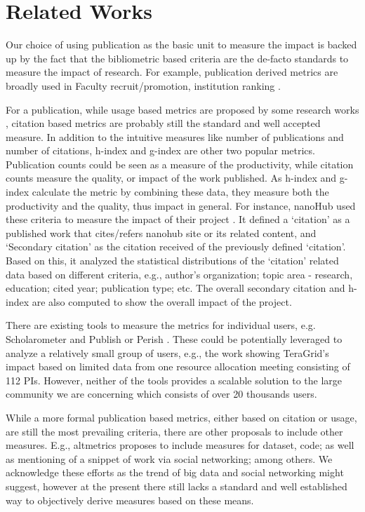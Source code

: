 \section{Related Works}

Our choice of using publication as the basic unit to measure the impact is backed up by the fact that the bibliometric based criteria are the de-facto standards to measure the impact of research. For example, publication derived metrics are broadly used in Faculty recruit/promotion, institution ranking \cite{thomas1998institutional}.

For a publication, while usage based metrics are proposed by some research works \cite{Bollen:2007:MUM:1255175.1255273} \cite{Bollen:2008:TUI:1378889.1378928} \cite{bollen2009principal}, citation based metrics are probably still the standard and well accepted measure. In addition to the intuitive measures like number of publications and number of citations, h-index \cite{hirsch2005index} and g-index \cite{egghe2006theory} are other two popular metrics. Publication counts could be seen as a measure of the productivity, while citation counts measure the quality, or impact of the work published. As h-index and g-index calculate the metric by combining these data, they measure both the productivity and the quality, thus impact in general. For instance, nanoHub used these criteria to measure the impact of their project \cite{www-nanohubcite}. It defined a `citation' as a published work that cites/refers nanohub site or its related content, and `Secondary citation' as the citation received of the previously defined `citation'. Based on this, it analyzed the statistical distributions of the `citation' related data based on different criteria, e.g., author's organization; topic area - research, education; cited year; publication type; etc. The overall secondary citation and h-index are also computed to show the overall impact of the project.

There are existing tools to measure the metrics for individual users, e.g. Scholarometer \cite{kaur2012scholarometer} and Publish or Perish \cite{www-pop}. These could be potentially leveraged to analyze a relatively small group of users, e.g., the work \cite{bollen2011and} showing TeraGrid's impact based on limited data from one resource allocation meeting consisting of 112 PIs.
However, neither of the tools provides a scalable solution to the large community we are concerning which consists of over 20 thousands users.

While a more formal publication based metrics, either based on citation or usage, are still the most prevailing criteria, there are other proposals to include other measures. E.g., altmetrics \cite{www-altmetrics} proposes to include measures for dataset, code; as well as mentioning of a snippet of work via social networking; among others. We acknowledge these efforts as the trend of big data and social networking might suggest, however at the present there still lacks a standard and well established way to objectively derive measures based on these means.

